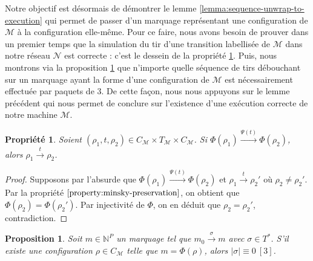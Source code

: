 \documentclass{article}
\newtheorem{property}{Propriété}
\newtheorem{proposition}{Proposition}
\theoremstyle{remark}
\theoremstyle{remark}
\newcommand{\reaches}[1][]{\xrightarrow{#1}}
\begin{document}
Notre objectif est désormais de démontrer le lemme \ref{lemma:sequence-unwrap-to-execution} qui permet de passer d'un marquage représentant une configuration de $\mathcal{M}$ à la configuration elle-même. Pour ce faire, nous avons besoin de prouver dans un premier temps que la simulation du tir d'une transition labellisée de $\mathcal{M}$ dans notre réseau $\mathcal{N}$ est correcte : c'est le dessein de la propriété \ref{property:exec-to-run}. Puis, nous montrons via la proposition \ref{proposition:triplet-sequence} que n'importe quelle séquence de tirs débouchant sur un marquage ayant la forme d'une configuration de $\mathcal{M}$ est nécessairement effectuée par paquets de 3. De cette façon, nous nous appuyons sur le lemme précédent qui nous permet de conclure sur l'existence d'une exécution correcte de notre machine $\mathcal{M}$.

\begin{property}
    \label{property:exec-to-run}
    Soient $(\rho_1, t, \rho_2) \in C_{\mathcal{M}} \times T_{\mathcal{M}} \times C_{\mathcal{M}}$. Si $\Phi(\rho_1) \reaches[\Psi(t)] \Phi(\rho_2)$, alors $\rho_1 \reaches[t] \rho_2$.
\end{property}

\begin{proof}
    Supposons par l'absurde que $\Phi(\rho_1) \reaches[\Psi(t)] \Phi(\rho_2)$ et $\rho_1 \reaches[t] \rho_2'$ où $\rho_2 \neq \rho_2'$. Par la propriété $\ref{property:minsky-preservation}$, on obtient que $\Phi(\rho_2) = \Phi(\rho_2')$. Par injectivité de $\Phi$, on en déduit que $\rho_2 = \rho_2'$, contradiction.
\end{proof}

\begin{proposition}
    \label{proposition:triplet-sequence}
    Soit $m \in \mathbb{N}^P$ un marquage tel que $m_0 \reaches[\sigma] m$ avec $\sigma \in T^*$. S'il existe une configuration $\rho \in C_{\mathcal{M}}$ telle que $m = \Phi(\rho)$, alors $|\sigma| \equiv 0\ [3]$.
\end{proposition}
\end{document}
